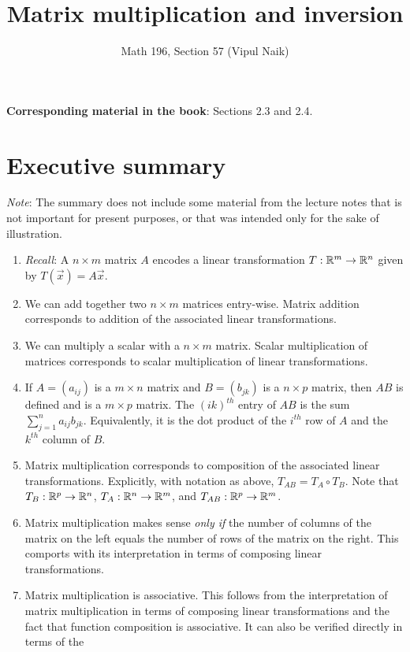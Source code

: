 \documentclass[10pt]{amsart}
\title{Matrix multiplication and inversion}
\author{Math 196, Section 57 (Vipul Naik)}
\begin{document}
\maketitle

{\bf Corresponding material in the book}: Sections 2.3 and 2.4.

\section*{Executive summary}

{\em Note}: The summary does not include some material from the
lecture notes that is not important for present purposes, or that was
intended only for the sake of illustration.

\begin{enumerate}
\item {\em Recall}: A $n \times m$ matrix $A$ encodes a linear
  transformation $T:\mathbb{R}^m \to \mathbb{R}^n$ given by $T(\vec{x}) = A\vec{x}$.
\item We can add together two $n \times m$ matrices entry-wise. Matrix
  addition corresponds to addition of the associated linear
  transformations.
\item We can multiply a scalar with a $n \times m$ matrix. Scalar
  multiplication of matrices corresponds to scalar multiplication of
  linear transformations.
\item If $A = (a_{ij})$ is a $m \times n$ matrix and $B = (b_{jk})$ is
  a $n \times p$ matrix, then $AB$ is defined and is a $m \times p$
  matrix. The $(ik)^{th}$ entry of $AB$ is the sum $\sum_{j=1}^n
  a_{ij}b_{jk}$. Equivalently, it is the dot product of the $i^{th}$
  row of $A$ and the $k^{th}$ column of $B$.
\item Matrix multiplication corresponds to composition of the
  associated linear transformations. Explicitly, with notation as
  above, $T_{AB} = T_A \circ T_B$. Note that $T_B: \mathbb{R}^p \to \mathbb{R}^n$,
  $T_A: \mathbb{R}^n \to \mathbb{R}^m$, and $T_{AB}: \mathbb{R}^p \to \mathbb{R}^m$.
\item Matrix multiplication makes sense {\em only if} the number of
  columns of the matrix on the left equals the number of rows of the
  matrix on the right. This comports with its interpretation in terms
  of composing linear transformations.
\item Matrix multiplication is associative. This follows from the
  interpretation of matrix multiplication in terms of composing linear
  transformations and the fact that function composition is
  associative. It can also be verified directly in terms of the

\end{enumerate}
\end{document}
